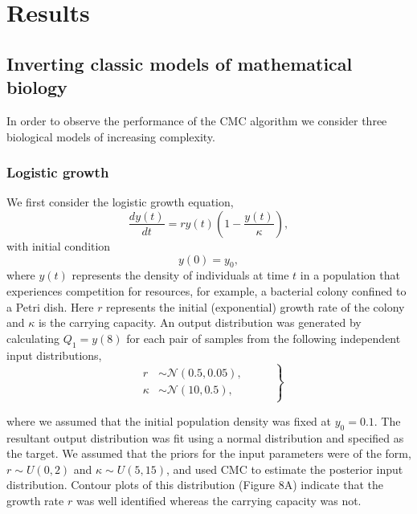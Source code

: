 \documentclass[10pt,letterpaper]{article}
\begin{document}
\section{Results}
\subsection{Inverting classic models of mathematical biology}
\label{sec:results}

In order to observe the performance of the CMC algorithm we consider three biological models of increasing complexity.


\subsubsection{Logistic growth}
\label{sec:logistic}

We first consider the logistic growth equation,
%
\begin{equation}
\frac{dy(t)}{dt} = r y(t) \left( 1 - \frac{y(t)}{\kappa} \right),
\end{equation}
with initial condition
\begin{equation}
y(0)=y_0,
\end{equation}
%
where $y(t)$ represents the density of individuals at time $t$ in a population that experiences competition for resources, for example, a bacterial colony confined to a Petri dish. Here $r$ represents the initial (exponential) growth rate of the colony and $\kappa$ is the carrying capacity. An output distribution was generated by calculating $Q_1=y(8)$ for each pair of samples from the following independent input distributions,
%
\begin{equation}
\left .
\begin{gathered}\begin{aligned}
r&\sim \mathcal{N}\left(0.5,0.05\right),     \\
\kappa &\sim \mathcal{N}\left(10,0.5\right),
\end{aligned} \end{gathered}
\qquad \right\}
\end{equation}

%
\noindent
where we assumed that the initial population density was fixed at $y_0=0.1$. The resultant output distribution was fit using a normal distribution and specified as the target. We assumed that the priors for the input parameters were of the form, $r\sim U(0,2)$ and $\kappa\sim U(5,15)$, and used CMC to estimate the posterior input distribution. Contour plots of this distribution (Figure 8A) indicate that the growth rate $r$ was well identified whereas the carrying capacity was not.
\end{document}
